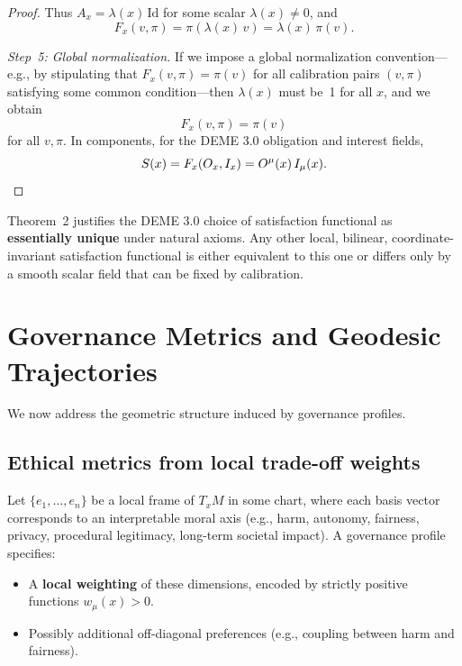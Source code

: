 \documentclass[12pt]{article}
\theoremstyle{remark}
\begin{document}
\begin{proof}
Thus $A_x = \lambda(x)\,\mathrm{Id}$ for some scalar $\lambda(x) \neq 0$, and
\begin{equation}
    F_x(v, \pi) = \pi(\lambda(x)\, v) = \lambda(x)\, \pi(v).
\end{equation}

\medskip
\emph{Step~5: Global normalization.}
If we impose a global normalization convention---e.g., by stipulating that $F_x(v, \pi) = \pi(v)$ for all calibration pairs $(v, \pi)$ satisfying some common condition---then $\lambda(x)$ must be~1 for all $x$, and we obtain
\begin{equation}
    F_x(v, \pi) = \pi(v)
\end{equation}
for all $v, \pi$. In components, for the DEME 3.0 obligation and interest fields,
\begin{equation}
    S(x) = F_x(O_x, I_x) = O^\mu(x)\, I_\mu(x). \qedhere
\end{equation}
\end{proof}

Theorem~2 justifies the DEME 3.0 choice of satisfaction functional as \textbf{essentially unique} under natural axioms. Any other local, bilinear, coordinate-invariant satisfaction functional is either equivalent to this one or differs only by a smooth scalar field that can be fixed by calibration.

\section{Governance Metrics and Geodesic Trajectories}

We now address the geometric structure induced by governance profiles.

\subsection{Ethical metrics from local trade-off weights}

Let $\{e_1, \dots, e_n\}$ be a local frame of $T_x M$ in some chart, where each basis vector corresponds to an interpretable moral axis (e.g., harm, autonomy, fairness, privacy, procedural legitimacy, long-term societal impact). A governance profile specifies:

\begin{itemize}
    \item A \textbf{local weighting} of these dimensions, encoded by strictly positive functions $w_\mu(x) > 0$.
    \item Possibly additional off-diagonal preferences (e.g., coupling between harm and fairness).
\end{itemize}
\end{document}
